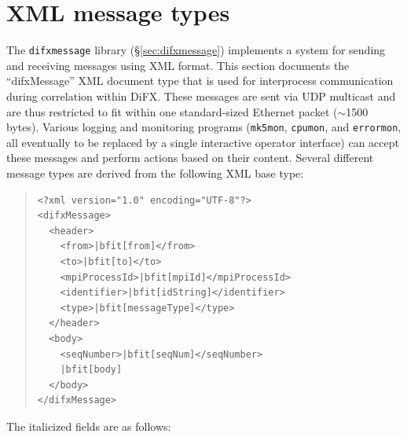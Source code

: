 \section{XML message types} \label{sec:xml}

\vspace{-20pt}\hspace{180pt}
\difxoneone

\vspace{7pt}

The {\tt difxmessage} library (\S\ref{sec:difxmessage}) implements a system for sending and receiving messages using XML format.
This section documents the ``difxMessage'' XML document type that is used for interprocess communication during correlation within DiFX.
These messages are sent via UDP multicast and are thus restricted to fit within one standard-sized Ethernet packet ($\sim$1500 bytes).
Various logging and monitoring programs ({\tt mk5mon}, {\tt cpumon}, and {\tt errormon}, all eventually to be replaced by a single interactive operator interface) can accept these messages and perform actions based on their content.
Several different message types are derived from the following XML base type:

\begin{quotation}
\begin{Verbatim}[commandchars=\|\[\]]
<?xml version="1.0" encoding="UTF-8"?>
<difxMessage>
  <header>
    <from>|bfit[from]</from>
    <to>|bfit[to]</to>
    <mpiProcessId>|bfit[mpiId]</mpiProcessId>
    <identifier>|bfit[idString]</identifier>
    <type>|bfit[messageType]</type>
  </header>
  <body>
    <seqNumber>|bfit[seqNum]</seqNumber>
    |bfit[body]
  </body>
</difxMessage>
\end{Verbatim}
\end{quotation}

\noindent The italicized fields are as follows:

